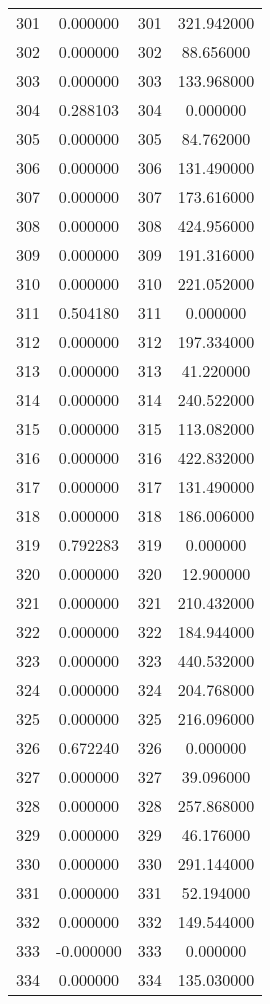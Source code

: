 \documentclass[12pt]{article}
\begin{document}
\begin{longtable}{@{}cccc@{}}
301 & 0.000000 & 301 & 321.942000 \\
302 & 0.000000 & 302 & 88.656000 \\
303 & 0.000000 & 303 & 133.968000 \\
304 & 0.288103 & 304 & 0.000000 \\
305 & 0.000000 & 305 & 84.762000 \\
306 & 0.000000 & 306 & 131.490000 \\
307 & 0.000000 & 307 & 173.616000 \\
308 & 0.000000 & 308 & 424.956000 \\
309 & 0.000000 & 309 & 191.316000 \\
310 & 0.000000 & 310 & 221.052000 \\
311 & 0.504180 & 311 & 0.000000 \\
312 & 0.000000 & 312 & 197.334000 \\
313 & 0.000000 & 313 & 41.220000 \\
314 & 0.000000 & 314 & 240.522000 \\
315 & 0.000000 & 315 & 113.082000 \\
316 & 0.000000 & 316 & 422.832000 \\
317 & 0.000000 & 317 & 131.490000 \\
318 & 0.000000 & 318 & 186.006000 \\
319 & 0.792283 & 319 & 0.000000 \\
320 & 0.000000 & 320 & 12.900000 \\
321 & 0.000000 & 321 & 210.432000 \\
322 & 0.000000 & 322 & 184.944000 \\
323 & 0.000000 & 323 & 440.532000 \\
324 & 0.000000 & 324 & 204.768000 \\
325 & 0.000000 & 325 & 216.096000 \\
326 & 0.672240 & 326 & 0.000000 \\
327 & 0.000000 & 327 & 39.096000 \\
328 & 0.000000 & 328 & 257.868000 \\
329 & 0.000000 & 329 & 46.176000 \\
330 & 0.000000 & 330 & 291.144000 \\
331 & 0.000000 & 331 & 52.194000 \\
332 & 0.000000 & 332 & 149.544000 \\
333 & -0.000000 & 333 & 0.000000 \\
334 & 0.000000 & 334 & 135.030000 \\

\end{longtable}
\end{document}
